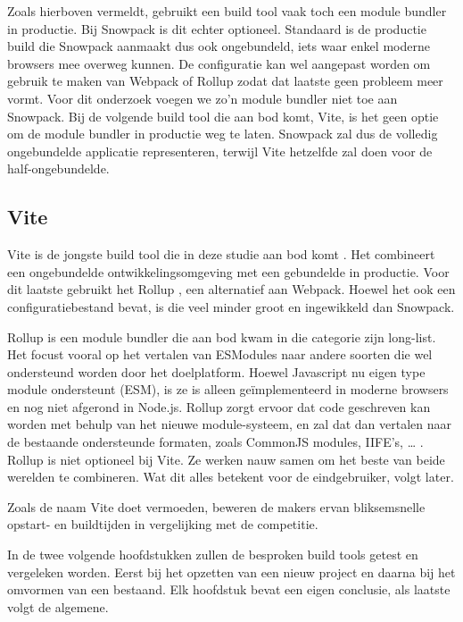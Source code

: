 Zoals hierboven vermeldt, gebruikt een build tool vaak toch een module bundler in productie. Bij Snowpack is dit echter optioneel. Standaard is de productie build die Snowpack aanmaakt dus ook ongebundeld, iets waar enkel moderne browsers mee overweg kunnen. De configuratie kan wel aangepast worden om gebruik te maken van Webpack of Rollup zodat dat laatste geen probleem meer vormt. Voor dit onderzoek voegen we zo’n module bundler niet toe aan Snowpack. Bij de volgende build tool die aan bod komt, Vite, is het geen optie om de module bundler in productie weg te laten. Snowpack zal dus de volledig ongebundelde applicatie representeren, terwijl Vite hetzelfde zal doen voor de half-ongebundelde.

\subsection{Vite}
Vite \autocite{vite-2020} is de jongste build tool die in deze studie aan bod komt \autocite{vite-2020B}. Het combineert een ongebundelde ontwikkelingsomgeving met een gebundelde in productie. Voor dit laatste gebruikt het Rollup \autocite{vite-no-date}, een alternatief aan Webpack. Hoewel het ook een configuratiebestand bevat, is die veel minder groot en ingewikkeld dan Snowpack. 

Rollup is een module bundler die aan bod kwam in die categorie zijn long-list. Het focust vooral op het vertalen van ESModules naar andere soorten die wel ondersteund worden door het doelplatform. Hoewel Javascript nu eigen type module ondersteunt (ESM), is ze is alleen geïmplementeerd in moderne browsers en nog niet afgerond in Node.js. Rollup zorgt ervoor dat code geschreven kan worden met behulp van het nieuwe module-systeem, en zal dat dan vertalen naar de bestaande ondersteunde formaten, zoals CommonJS modules, IIFE’s, … . Rollup is niet optioneel bij Vite. Ze werken nauw samen om het beste van beide werelden te combineren. Wat dit alles betekent voor de eindgebruiker, volgt later.

Zoals de naam Vite doet vermoeden, beweren de makers ervan bliksemsnelle opstart- en buildtijden in vergelijking met de competitie.


In de twee volgende hoofdstukken zullen de besproken build tools getest en vergeleken worden. Eerst bij het opzetten van een nieuw project en daarna bij het omvormen van een bestaand. Elk hoofdstuk bevat een eigen conclusie, als laatste volgt de algemene.

